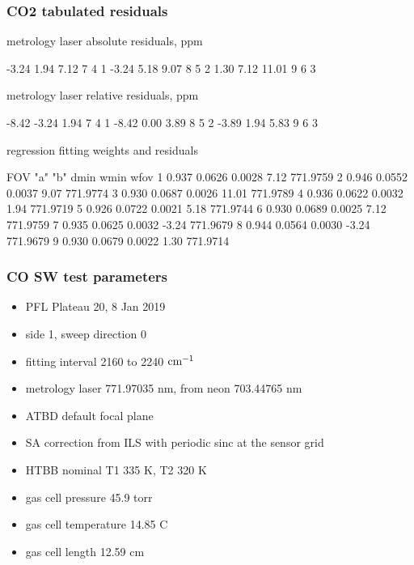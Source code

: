 \documentclass[10pt]{beamer}
\begin{document}
\begin{frame}[fragile]
\frametitle{CO2 tabulated residuals}

  metrology laser absolute residuals, ppm
\begin{semiverbatim}\scriptsize
     -3.24     1.94     7.12         7   4   1
     -3.24     5.18     9.07         8   5   2
      1.30     7.12    11.01         9   6   3
\end{semiverbatim}

  metrology laser relative residuals, ppm
\begin{semiverbatim}\scriptsize
     -8.42    -3.24     1.94         7   4   1
     -8.42     0.00     3.89         8   5   2
     -3.89     1.94     5.83         9   6   3
 \end{semiverbatim}

     regression fitting weights and residuals
\begin{semiverbatim}\scriptsize
 FOV   "a"       "b"     dmin     wmin      wfov
  1   0.937    0.0626   0.0028     7.12   771.9759 
  2   0.946    0.0552   0.0037     9.07   771.9774 
  3   0.930    0.0687   0.0026    11.01   771.9789 
  4   0.936    0.0622   0.0032     1.94   771.9719 
  5   0.926    0.0722   0.0021     5.18   771.9744 
  6   0.930    0.0689   0.0025     7.12   771.9759 
  7   0.935    0.0625   0.0032    -3.24   771.9679 
  8   0.944    0.0564   0.0030    -3.24   771.9679 
  9   0.930    0.0679   0.0022     1.30   771.9714 
\end{semiverbatim}

\end{frame}
\begin{frame}
\frametitle{CO SW test parameters}

\begin{itemize}
  \item PFL Plateau 20, 8 Jan 2019
  \item side 1, sweep direction 0
  \item fitting interval 2160 to 2240 $\mbox{cm$^{-1}$}$
  \item metrology laser 771.97035 nm, from neon 703.44765 nm
  \item ATBD default focal plane
  \item SA correction from ILS with periodic sinc at the sensor grid
  \item HTBB nominal T1 335 K, T2 320 K
  \item gas cell pressure 45.9 torr
  \item gas cell temperature 14.85 C
  \item gas cell length 12.59 cm
\end{itemize}

\end{frame}
\end{document}
